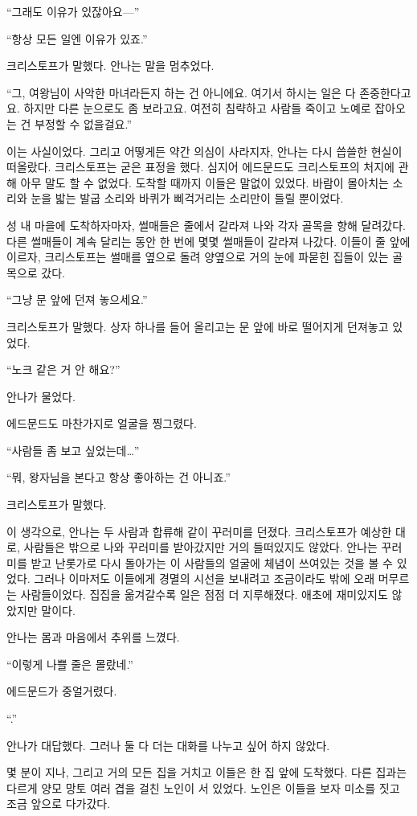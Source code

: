 ``그래도 이유가 있잖아요—''

``항상 모든 일엔 이유가 있죠.''

크리스토프가 말했다. 안나는 말을 멈추었다.

``그, 여왕님이 사악한 마녀라든지 하는 건 아니에요. 여기서 하시는 일은 다 존중한다고요. 하지만 다른 눈으로도 좀 보라고요. 여전히 침략하고 사람들 죽이고 노예로 잡아오는 건 부정할 수 없을걸요.''

이는 사실이었다. 그리고 어떻게든 약간 의심이 사라지자, 안나는 다시 씁쓸한 현실이 떠올랐다. 크리스토프는 굳은 표정을 했다. 심지어 에드문드도 크리스토프의 처지에 관해 아무 말도 할 수 없었다. 도착할 때까지 이들은 말없이 있었다. 바람이 몰아치는 소리와 눈을 밟는 발굽 소리와 바퀴가 삐걱거리는 소리만이 들릴 뿐이었다.

성 내 마을에 도착하자마자, 썰매들은 줄에서 갈라져 나와 각자 골목을 향해 달려갔다. 다른 썰매들이 계속 달리는 동안 한 번에 몇몇 썰매들이 갈라져 나갔다. 이들이 줄 앞에 이르자, 크리스토프는 썰매를 옆으로 돌려 양옆으로 거의 눈에 파묻힌 집들이 있는 골목으로 갔다.

``그냥 문 앞에 던져 놓으세요.''

크리스토프가 말했다. 상자 하나를 들어 올리고는 문 앞에 바로 떨어지게 던져놓고 있었다.

``노크 같은 거 안 해요?''

안나가 물었다.

에드문드도 마찬가지로 얼굴을 찡그렸다.

``사람들 좀 보고 싶었는데\ldots''

``뭐, 왕자님을 본다고 항상 좋아하는 건 아니죠.''

크리스토프가 말했다.

이 생각으로, 안나는 두 사람과 합류해 같이 꾸러미를 던졌다. 크리스토프가 예상한 대로, 사람들은 밖으로 나와 꾸러미를 받아갔지만 거의 들떠있지도 않았다. 안나는 꾸러미를 받고 난롯가로 다시 돌아가는 이 사람들의 얼굴에 체념이 쓰여있는 것을 볼 수 있었다. 그러나 이마저도 이들에게 경멸의 시선을 보내려고 조금이라도 밖에 오래 머무르는 사람들이었다. 집집을 옮겨갈수록 일은 점점 더 지루해졌다. 애초에 재미있지도 않았지만 말이다.

안나는 몸과 마음에서 추위를 느꼈다.

``이렇게 나쁠 줄은 몰랐네.''

에드문드가 중얼거렸다.

``.''

안나가 대답했다. 그러나 둘 다 더는 대화를 나누고 싶어 하지 않았다.

몇 분이 지나, 그리고 거의 모든 집을 거치고 이들은 한 집 앞에 도착했다. 다른 집과는 다르게 양모 망토 여러 겹을 걸친 노인이 서 있었다. 노인은 이들을 보자 미소를 짓고 조금 앞으로 다가갔다.

